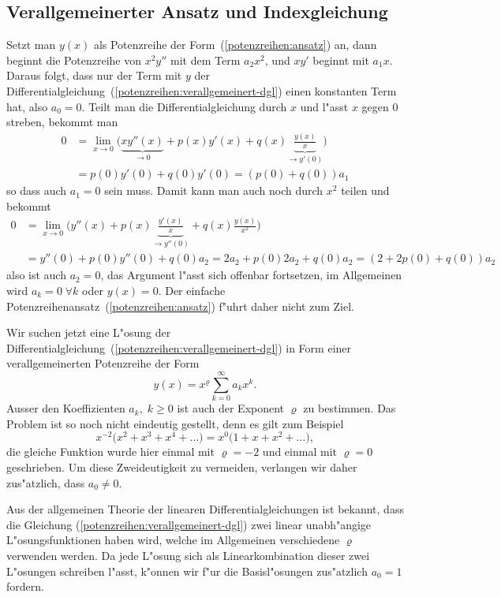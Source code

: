 \subsection{Verallgemeinerter Ansatz und Indexgleichung}
\label{subsection:potenzreihen:indexgleichung}
Setzt man $y(x)$ als Potenzreihe der Form~(\ref{potenzreihen:ansatz}) an,
dann beginnt die Potenzreihe von $x^2y''$ mit dem Term $a_2x^2$,
und $xy'$ beginnt mit $a_1x$.
Daraus folgt, dass nur der Term mit $y$ der
Differentialgleichung~(\ref{potenzreihen:verallgemeinert-dgl})
einen konstanten Term hat, also $a_0=0$.
Teilt man die Differentialgleichung durch $x$ und l"asst $x$ gegen $0$
streben, bekommt man
\begin{align*}
0&=
\lim_{x\to 0}\biggl(
\underbrace{xy''(x)}_{\to 0}+p(x)y'(x)+q(x)\underbrace{\frac{y(x)}{x}}_{\to y'(0)}\biggr)
\\
&=
p(0)y'(0)+q(0)y'(0)
=(p(0)+q(0))a_1
\end{align*}
so dass auch $a_1=0$ sein muss.
Damit kann man auch noch durch $x^2$ teilen und bekommt
\begin{align*}
0&=
\lim_{x\to 0}\biggl(
y''(x)+p(x)\underbrace{\frac{y'(x)}{x}}_{\to y''(0)}+q(x)\frac{y(x)}{x^2}
\biggr)
\\
&=y''(0)+p(0)y''(0)+q(0)a_2
=2a_2+p(0)2a_2+q(0)a_2
=(2+2p(0)+q(0))a_2
\end{align*}
also ist auch $a_2=0$, das Argument l"asst sich offenbar fortsetzen, 
im Allgemeinen wird $a_k=0\;\forall k$ oder $y(x)=0$.
Der einfache Potenzreihenansatz~(\ref{potenzreihen:ansatz}) f"uhrt
daher nicht zum Ziel.

Wir suchen jetzt eine L"osung der
Differentialgleichung~(\ref{potenzreihen:verallgemeinert-dgl})
in Form einer verallgemeinerten Potenzreihe der Form
\begin{equation}
y(x)=x^\varrho\sum_{k=0}^\infty a_kx^k.
\label{potenzreihen:verallgemeinert}
\end{equation}
%
Ausser den Koeffizienten $a_k,\;k\ge 0$ ist auch der Exponent
$\varrho$ zu bestimmen.
Das Problem ist so noch nicht eindeutig gestellt, denn es gilt zum Beispiel
\[
x^{-2}\bigl(x^2 + x^3 + x^4 + \dots\bigr)
=
x^{0}\bigl(1+x + x^2 + \dots\bigr),
\]
die gleiche Funktion wurde hier einmal mit $\varrho=-2$ und einmal
mit $\varrho=0$ geschrieben.
Um diese Zweideutigkeit zu vermeiden,
verlangen wir daher zus"atzlich, dass $a_0\ne 0$.

Aus der allgemeinen Theorie der linearen Differentialgleichungen
ist bekannt, dass die Gleichung (\ref{potenzreihen:verallgemeinert-dgl})
zwei linear unabh"angige L"osungsfunktionen haben wird,
welche im Allgemeinen verschiedene $\varrho$ verwenden werden.
Da jede L"osung sich als Linearkombination dieser zwei L"osungen schreiben
l"asst, k"onnen wir f"ur die Basisl"osungen zus"atzlich $a_0=1$ fordern.


